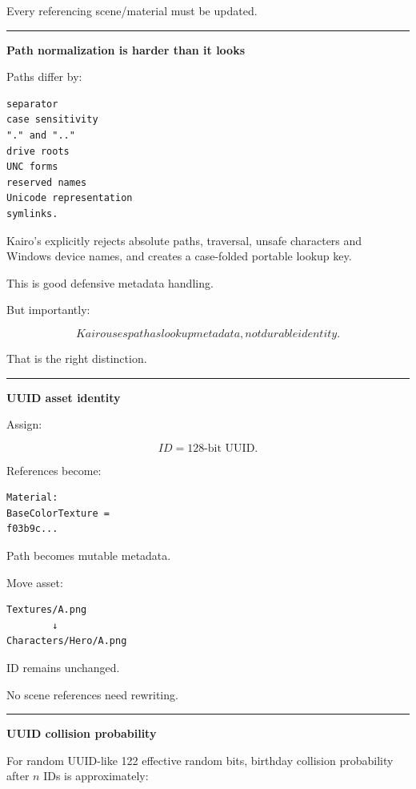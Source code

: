 Every referencing scene/material must be updated.

\begin{center}\rule{0.5\linewidth}{0.5pt}\end{center}

\textbf{Path normalization is harder than it looks}

Paths differ by:

\begin{verbatim}
separator
case sensitivity
"." and ".."
drive roots
UNC forms
reserved names
Unicode representation
symlinks.
\end{verbatim}

Kairo's  explicitly rejects absolute paths, traversal, unsafe characters and Windows device names, and creates a case-folded portable lookup key.

This is good defensive metadata handling.

But importantly:

\[
\boxed{
Kairo uses path as lookup metadata,
not durable identity.
}
\]

That is the right distinction.

\begin{center}\rule{0.5\linewidth}{0.5pt}\end{center}

\textbf{UUID asset identity}

Assign:

\[
ID=
128\text{-bit UUID}.
\]

References become:

\begin{verbatim}
Material:
BaseColorTexture =
f03b9c...
\end{verbatim}

Path becomes mutable metadata.

Move asset:

\begin{verbatim}
Textures/A.png
        ↓
Characters/Hero/A.png
\end{verbatim}

ID remains unchanged.

No scene references need rewriting.

\begin{center}\rule{0.5\linewidth}{0.5pt}\end{center}

\textbf{UUID collision probability}

For random UUID-like 122 effective random bits, birthday collision probability after \(n\) IDs is approximately:

